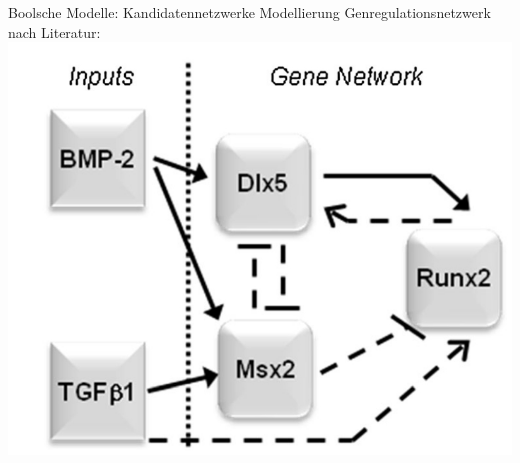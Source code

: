 \documentclass[]{beamer}
\begin{document}
\begin{frame}{Boolsche Modelle: Kandidatennetzwerke}
Modellierung Genregulationsnetzwerk nach Literatur:
	\pause
	\includegraphics[scale=0.22]{regulatory_network.jpg}
	\pause
\end{frame}
\end{document}
